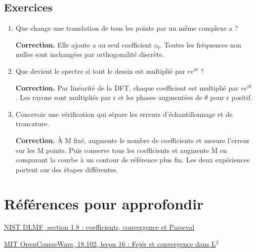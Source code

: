 \documentclass[11pt,a4paper]{article}
\begin{document}
\subsection*{Exercices}\begin{enumerate}
\item Que change une translation de tous les points par un même complexe a ?
\par\textbf{Correction.} Elle ajoute a au seul coefficient $c_0$. Toutes les fréquences non nulles sont inchangées par orthogonalité discrète.
\item Que devient le spectre si tout le dessin est multiplié par $re^{i\theta}$ ?
\par\textbf{Correction.} Par linéarité de la DFT, chaque coefficient est multiplié par $re^{i\theta}$. Les rayons sont multipliés par r et les phases augmentées de $\theta$ pour r positif.
\item Concevoir une vérification qui sépare les erreurs d’échantillonnage et de troncature.
\par\textbf{Correction.} À M fixé, augmente le nombre de coefficients et mesure l’erreur sur les M points. Puis conserve tous les coefficients et augmente M en comparant la courbe à un contour de référence plus fin. Les deux expériences portent sur des étapes différentes.
\end{enumerate}
\clearpage
\section*{Références pour approfondir}
\par\href{https://dlmf.nist.gov/1.8}{NIST DLMF, section 1.8 : coefficients, convergence et Parseval}
\par\href{https://ocw.mit.edu/courses/18-102-introduction-to-functional-analysis-spring-2021/resources/lecture-16-fejers-theorem-and-convergence-of-fourier-series/}{MIT OpenCourseWare, 18.102, leçon 16 : Fejér et convergence dans L$^2$}
\end{document}
